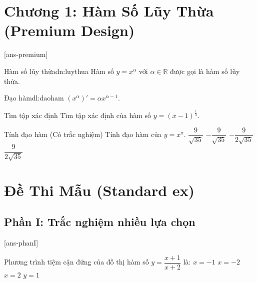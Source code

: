 \documentclass{article}
\begin{document}
\pagestyle{fancy} 
\chantrang{\pageref{LastPage}}{\made}

\section{Chương 1: Hàm Số Lũy Thừa (Premium Design)}
[ans-premium]

\begin{dn}{Hàm số lũy thừa}{dn:luythua}
    Hàm số $y=x^\alpha$ với $\alpha \in \mathbb{R}$ được gọi là hàm số lũy thừa.
\end{dn}

\begin{dl}{Đạo hàm}{dl:daoham}
    $(x^\alpha)' = \alpha x^{\alpha-1}$.
\end{dl}

\begin{vd}{Tìm tập xác định}{}
    Tìm tập xác định của hàm số $y=(x-1)^{\frac{1}{3}}$.
\end{vd}

\begin{bt}{Tính đạo hàm (Có trắc nghiệm)}{}
    Tính đạo hàm của $y=x^{\pi}$.
    \choiceTF
	{$\dfrac{9}{\sqrt{35}}$}
	{$-\dfrac{9}{\sqrt{35}}$}
	{$-\dfrac{9}{2\sqrt{35}}$}
	{\True $\dfrac{9}{2\sqrt{35}}$}
\end{bt}

\section{Đề Thi Mẫu (Standard ex)}

\subsection{Phần I: Trắc nghiệm nhiều lựa chọn}
\caulc
{}[ans-phanI]

\begin{ex}
Phương trình tiệm cận đứng của đồ thị hàm số $y=\dfrac{x+1}{x+2}$ là:
\choice
    {$x=-1$}
    {\True $x=-2$}
    {$x=2$}
    {$y=1$}
\end{ex}
\end{document}
